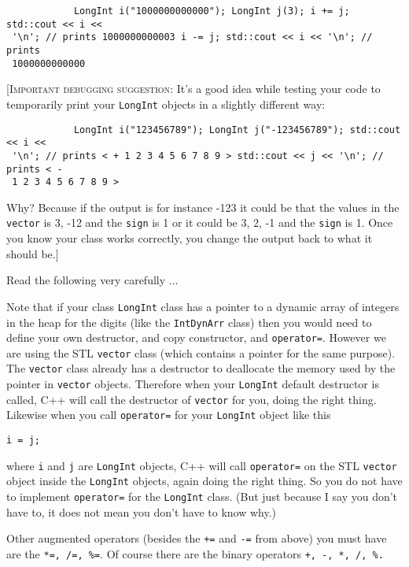 \begin{Verbatim}
            LongInt i("1000000000000"); LongInt j(3); i += j; std::cout << i <<
 '\n'; // prints 1000000000003 i -= j; std::cout << i << '\n'; // prints
 1000000000000
\end{Verbatim}

[\textsc{Important debugging suggestion}: It's a good idea while testing your
  code to temporarily print your \verb!LongInt! objects in a slightly different
  way:

\begin{Verbatim}
            LongInt i("123456789"); LongInt j("-123456789"); std::cout << i <<
 '\n'; // prints < + 1 2 3 4 5 6 7 8 9 > std::cout << j << '\n'; // prints < -
 1 2 3 4 5 6 7 8 9 >
\end{Verbatim}

Why? Because if the output is for instance -123 it could be that the values in
the \verb!vector! is 3, -12 and the \verb!sign! is 1 or it could be 3, 2, -1
and the \verb!sign! is 1. Once you know your class works correctly, you change
the output back to what it should be.]

Read the following very carefully ...

Note that if your class \verb!LongInt! class has a pointer to a dynamic array
of integers in the heap for the digits (like the \verb!IntDynArr!  class) then
you would need to define your own destructor, and copy constructor, and
\verb!operator=!. However we are using the STL \verb!vector! class (which
contains a pointer for the same purpose). The \verb!vector!  class already has
a destructor to deallocate the memory used by the pointer in \verb!vector!
objects. Therefore when your \verb!LongInt!  default destructor is called, C++
will call the destructor of \verb!vector! for you, doing the right
thing. Likewise when you call \verb!operator=! for your \verb!LongInt! object
like this
\begin{Verbatim}[frame=single,fontsize=\footnotesize]
i = j;
\end{Verbatim}
where \verb!i! and \verb!j! are \verb!LongInt! objects, C++ will call
\verb!operator=! on the STL \verb!vector! object inside the \verb!LongInt!
objects, again doing the right thing. So you do not have to implement
\verb!operator=! for the \verb!LongInt! class. (But just because I say you
don't have to, it does not mean you don't have to know why.)

Other augmented operators (besides the \verb!+=! and \verb!-=! from above) you
must have are the \verb!*=, /=, %=!. Of course there are the binary operators
\verb!+, -, *, /, %.!

